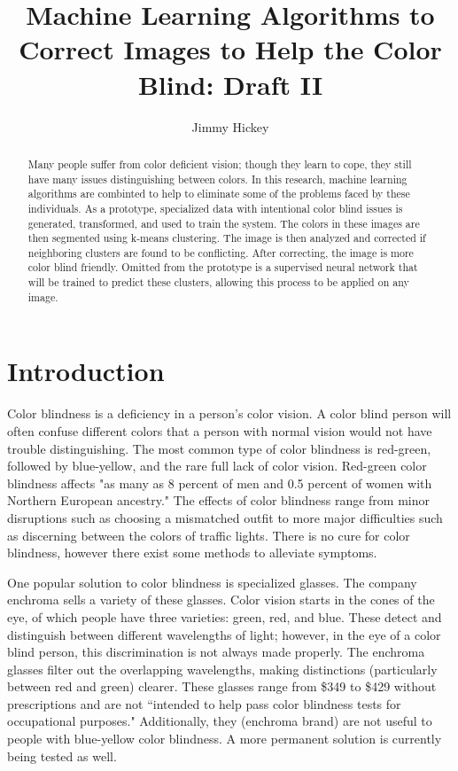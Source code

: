 \documentclass[12pt]{article}
\title{
Machine Learning Algorithms to Correct Images to Help the Color Blind: Draft II
}
\author{Jimmy Hickey}
\begin{document}
\maketitle
\doublespacing

\begin{abstract}
Many people suffer from color deficient vision; though they learn to cope, they still have many issues distinguishing between colors. In this research, machine learning algorithms are combinted to help to eliminate some of the problems faced by these individuals. As a prototype, specialized data with intentional color blind issues is generated, transformed, and used to train the system. The colors in these images are then segmented using k-means clustering. The image is then analyzed and corrected if neighboring clusters are found to be conflicting. After correcting, the image is more color blind friendly. Omitted from the prototype is a supervised neural network that will be trained to predict these clusters, allowing this process to be applied on any image.

\end{abstract}

\section{Introduction}

Color blindness is a deficiency in a person's color vision. A color blind person will often confuse different colors that a person with normal vision would not have trouble distinguishing. The most common type of color blindness is red-green, followed by blue-yellow, and the rare full lack of color vision. Red-green color blindness affects "as many as 8 percent of men and 0.5 percent of women with Northern European ancestry." \cite{NEI} The effects of color blindness range from minor disruptions such as choosing a mismatched outfit to more major difficulties such as discerning between the colors of traffic lights.
There is no cure for color blindness, however there exist some methods to alleviate symptoms. 

One popular solution to color blindness is specialized glasses. \cite{MITGlasses} The company enchroma sells a variety of these glasses. Color vision starts in the cones of the eye, of which people have three varieties: green, red, and blue. These detect and distinguish between different wavelengths of light; however, in the eye of a color blind person, this discrimination is not always made properly. The enchroma glasses filter out the overlapping wavelengths, making distinctions (particularly between red and green) clearer. These glasses range from \$349 to \$429 without prescriptions and are not ``intended to help pass color blindness tests for occupational purposes."\cite{enchroma} Additionally, they (enchroma brand) are not useful to people with blue-yellow color blindness. A more permanent solution is currently being tested as well.
\end{document}
